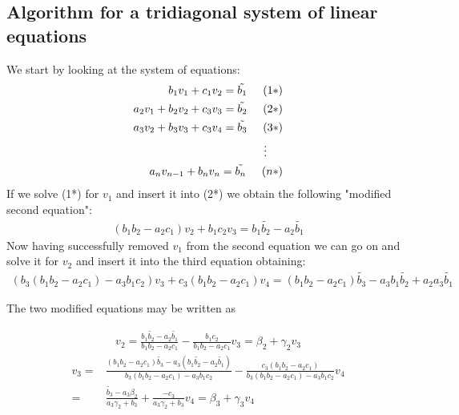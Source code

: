 \documentclass[11pt,a4paper,english]{article}
\begin{document}
\newpage

\subsection*{Algorithm for a tridiagonal system of linear equations}

We start by looking at the system of equations:
\begin{align*}
	 b_1 v_1 + c_1 v_{2} = \tilde{b_1} \hspace{0.5cm} (1*)\\
	 a_2 v_1 + b_2 v_2 + c_3 v_3 = \tilde{b_2} \hspace{0.5cm} (2*) \\
	 a_3 v_2 + b_3 v_3 + c_3 v_4 = \tilde{b_3} \hspace{0.5cm} (3*) \\
	 \vdots \hspace{0.5cm}  \\ 
	 a_n v_{n-1} + b_n v_n = \tilde{b_n} \hspace{0.5cm} (n*)\\
\end{align*}
If we solve (1*) for $v_1$ and insert it into (2*) we obtain the following "modified second equation":
\begin{align*}
	(b_1 b_2 - a_2 c_1)v_2 + b_1 c_2 v_3 = b_1 \tilde{b_2} - a_2  \tilde{b_1}  
\end{align*}
Now having successfully removed $v_1$ from the second equation we can go on and solve it for $v_2$ and insert it into the third equation obtaining:
\begin{align*}
(b_3 (b_1 b_2 - a_2 c_1)- a_3 b_1 c_2)v_3 + c_3(b_1 b_2 -a_2 c_1)v_4 = (b_1 b_2 - a_2 c_1 ) \tilde{b_3} - a_3 b_1 \tilde{b_2} + a_2 a_3 \tilde{b_1} 
\end{align*}

The two modified equations may be written as 

\begin{align*}
v_2 = \frac{b_1 \tilde{b_2} - a_2 \tilde{b_1}}{b_1 b_2 - a_2 c_1} - \frac{b_1 c_2}{b_1 b_2 - a_2 c_1} v_3 = \beta_2 + \gamma_2 v_3
\end{align*}
\begin{align*}
v_3 =& \frac{(b_1 b_2 - a_2 c_1) \tilde{b_3} - a_3 (b_1 \tilde{b_2} - a_2 \tilde{b_1})}{b_3 (b_1 b_2 - a_2 c_1)- a_3 b_1 c_2} - \frac{c_3(b_1 b_2 - a_2 c_1)}{b_3 (b_1 b_2 - a_2 c_1)- a_3 b_1 c_2} v_4 \\
=&  \frac{\tilde{b_3}-a_3 \beta_2}{a_3 \gamma_2 + b_3} + \frac{-c_3}{a_3 \gamma_2 + b_3}v_4 = \beta_3 + \gamma_3 v_4
\end{align*}
\end{document}
